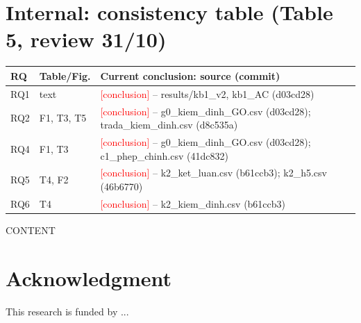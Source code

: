 \documentclass[conference]{IEEEtran}
\newcommand{\todoSV}[1]{\textcolor{red}{[#1]}}
\begin{document}
\section*{Internal: consistency table (Table 5, review 31/10)}
\begin{table}[!t]\centering\scriptsize
\begin{tabular}{@{}lll@{}}
\toprule
RQ & Table/Fig. & Current conclusion: source (commit) \\
\midrule
RQ1 & text & \todoSV{conclusion} -- results/kb1\_v2, kb1\_AC (d03cd28) \\
RQ2 & F1, T3, T5 & \todoSV{conclusion} -- g0\_kiem\_dinh\_GO.csv (d03cd28); trada\_kiem\_dinh.csv (d8c535a) \\
RQ4 & F1, T3 & \todoSV{conclusion} -- g0\_kiem\_dinh\_GO.csv (d03cd28); c1\_phep\_chinh.csv (41dc832) \\
RQ5 & T4, F2 & \todoSV{conclusion} -- k2\_ket\_luan.csv (b61ccb3); k2\_h5.csv (46b6770) \\
RQ6 & T4 & \todoSV{conclusion} -- k2\_kiem\_dinh.csv (b61ccb3) \\
\bottomrule
\end{tabular}
\end{table}
CONTENT \cite{nguyen2025data}
\section*{Acknowledgment}
This research is funded by ...

\balance

\end{document}
